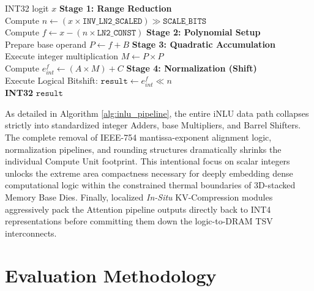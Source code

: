 \documentclass[10pt,conference]{IEEEtran}
\begin{document}
\begin{algorithm}[htbp]
\caption{The 4-Stage Pipelined iNLU Execution}
\label{alg:inlu_pipeline}
\begin{algorithmic}[1]
\REQUIRE INT32 logit $x$
\STATE \textbf{Stage 1: Range Reduction}\\
       Compute $n \leftarrow (x \times \mathtt{INV\_LN2\_SCALED}) \gg \mathtt{SCALE\_BITS} $\\
       Compute $f \leftarrow x - (n \times \mathtt{LN2\_CONST})$
\STATE \textbf{Stage 2: Polynomial Setup}\\
       Prepare base operand $P \leftarrow f + B$ 
\STATE \textbf{Stage 3: Quadratic Accumulation} \\
       Execute integer multiplication $M \leftarrow P \times P$\\
       Compute $e^f_{int} \leftarrow (A \times M) + C$
\STATE \textbf{Stage 4: Normalization (Shift)}\\
       Execute Logical Bitshift: $\mathtt{result} \leftarrow e^f_{int} \ll n$\\
\RETURN \textbf{INT32} $\mathtt{result}$
\end{algorithmic}
\end{algorithm}

As detailed in Algorithm \ref{alg:inlu_pipeline}, the entire iNLU data path collapses strictly into standardized integer Adders, base Multipliers, and Barrel Shifters. The complete removal of IEEE-754 mantissa-exponent alignment logic, normalization pipelines, and rounding structures dramatically shrinks the individual Compute Unit footprint. This intentional focus on scalar integers unlocks the extreme area compactness necessary for deeply embedding dense computational logic within the constrained thermal boundaries of 3D-stacked Memory Base Dies. Finally, localized \textit{In-Situ} KV-Compression modules aggressively pack the Attention pipeline outputs directly back to INT4 representations before committing them down the logic-to-DRAM TSV interconnects.


\section{Evaluation Methodology}
\end{document}
